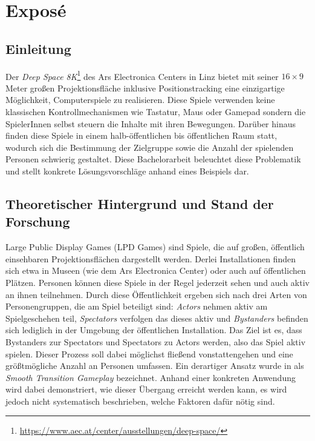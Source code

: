 \chapter{Exposé}

\section{Einleitung}

Der \emph{Deep Space 8K}\footnote{\url{https://www.aec.at/center/ausstellungen/deep-space/}} des Ars Electronica Centers in Linz bietet mit seiner $16 \times 9$ Meter großen Projektionsfläche inklusive Positionstracking eine einzigartige Möglichkeit, Computerspiele zu realisieren. Diese Spiele verwenden keine klassischen Kontrollmechanismen wie Tastatur, Maus oder Gamepad sondern die SpielerInnen selbst steuern die Inhalte mit ihren Bewegungen. Darüber hinaus finden diese Spiele in einem halb-öffentlichen bis öffentlichen Raum statt, wodurch sich die Bestimmung der Zielgruppe sowie die Anzahl der spielenden Personen schwierig gestaltet. Diese Bachelorarbeit beleuchtet diese Problematik und stellt konkrete Lösungsvorschläge anhand eines Beispiels dar.

\section{Theoretischer Hintergrund und Stand der Forschung}
\label{sec:hintergrund}

Large Public Display Games (LPD Games) sind Spiele, die auf großen, öffentlich einsehbaren Projektionsflächen dargestellt werden. Derlei Installationen finden sich etwa in Museen (wie dem Ars Electronica Center) oder auch auf öffentlichen Plätzen. Personen können diese Spiele in der Regel jederzeit sehen und auch aktiv an ihnen teilnehmen. Durch diese Öffentlichkeit ergeben sich nach \cite{Finke2008} drei Arten von Personengruppen, die am Spiel beteiligt sind: \emph{Actors} nehmen aktiv am Spielgeschehen teil, \emph{Spectators} verfolgen das dieses aktiv und \emph{Bystanders} befinden sich lediglich in der Umgebung der öffentlichen Installation. Das Ziel ist es, dass Bystanders zur Spectators und Spectators zu Actors werden, also das Spiel aktiv spielen. Dieser Prozess soll dabei möglichst fließend vonstattengehen und eine größtmögliche Anzahl an Personen umfassen. Ein derartiger Ansatz wurde in \cite{Hochleitner2013} als \emph{Smooth Transition Gameplay} bezeichnet. Anhand einer konkreten Anwendung wird dabei demonstriert, wie dieser Übergang erreicht werden kann, es wird jedoch nicht systematisch beschrieben, welche Faktoren dafür nötig sind.

